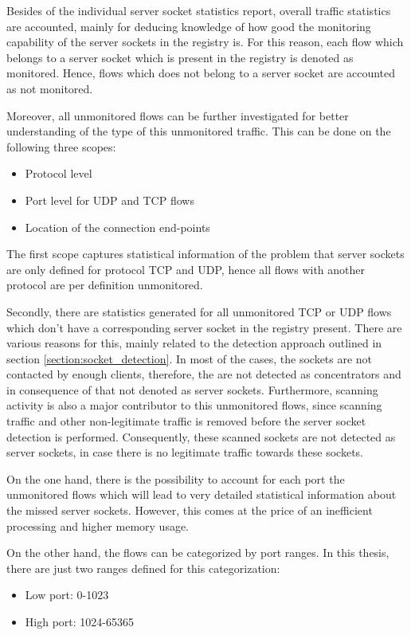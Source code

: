 Besides of the individual server socket statistics report, overall traffic statistics are accounted, mainly for deducing knowledge of how good the monitoring capability of the server sockets in the registry is. For this reason, each flow which belongs to a server socket which is present in the registry is denoted as monitored. Hence, flows which does not belong to a server socket are accounted as not monitored. 

Moreover, all unmonitored flows can be further investigated for better understanding of the type of this unmonitored traffic. This can be done on the following three scopes: 
\begin{itemize}
	\item Protocol level 
	\item Port level for UDP and TCP flows 
	\item Location of the connection end-points 
\end{itemize}

The first scope captures statistical information of the problem that server sockets are only defined for protocol TCP and UDP, hence all flows with another protocol are per definition unmonitored.

Secondly, there are statistics generated for all unmonitored TCP or UDP flows which don't have a corresponding server socket in the registry present. There are various reasons for this, mainly related to the detection approach outlined in section \ref{section:socket_detection}. In most of the cases, the sockets are not contacted by enough clients, therefore, the are not detected as concentrators and in consequence of that not denoted as server sockets. Furthermore, scanning activity is also a major contributor to this unmonitored flows, since scanning traffic and other non-legitimate traffic is removed before the server socket detection is performed. Consequently, these scanned sockets are not detected as server sockets, in case there is no legitimate traffic towards these sockets.

On the one hand, there is the possibility to account for each port the unmonitored flows which will lead to very detailed statistical information about the missed server sockets. However, this comes at the price of an inefficient processing and higher memory usage. 

On the other hand, the flows can be categorized by port ranges. In this thesis, there are just two ranges defined for this categorization:

\begin{itemize}
	\item Low port: 0-1023 
	\item High port: 1024-65365 
\end{itemize}

